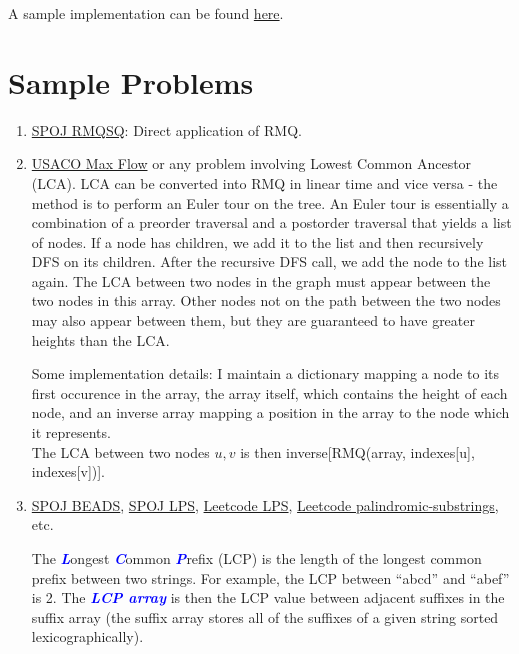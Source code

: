 \documentclass[11pt, oneside]{article}
\newcommand{\emphasis}[1]{\textcolor{blue}{\textbf{\textit{#1}}}}
\begin{document}
A sample implementation can be found \href{https://gist.github.com/stephen-huan/aa609965c86d750736398c28b025f9be#range-minimum-query}{here}.

\section{Sample Problems}

\begin{enumerate}
  \item \href{https://www.spoj.com/problems/RMQSQ/}{SPOJ RMQSQ}: Direct application of RMQ.

  \item \href{http://www.usaco.org/index.php?page=viewproblem2&cpid=576}{USACO Max Flow}
  or any problem involving Lowest Common Ancestor (LCA).
  LCA can be converted into RMQ in linear time and vice versa - the method is to
  perform an Euler tour on the tree. An Euler tour is essentially a combination of a
  preorder traversal and a postorder traversal that yields a list of nodes.
  If a node has children, we add it to the list and then recursively
  DFS on its children. After the recursive DFS call, we add the node to the list again.
  The LCA between two nodes in the graph must appear between the two nodes in this array.
  Other nodes not on the path between the two nodes may also appear between them,
  but they are guaranteed to have greater heights than the LCA.

  Some implementation details: I maintain a dictionary mapping a node to its first
  occurence in the array, the array itself, which contains the height of each node,
  and an inverse array mapping a position in the array to the node which it represents. \\
  The LCA between two nodes \( u, v \) is then inverse[RMQ(array, indexes[u], indexes[v])].

  \item \href{https://www.spoj.com/problems/BEADS/}{SPOJ BEADS}, \href{https://www.spoj.com/problems/LPS/}{SPOJ LPS},
  \href{https://leetcode.com/problems/longest-palindromic-substring/}{Leetcode LPS}, \href{https://leetcode.com/problems/palindromic-substrings/}{Leetcode palindromic-substrings}, etc.

  The \emphasis{L}ongest \emphasis{C}ommon \emphasis{P}refix (LCP) is
  the length of the longest common prefix between two strings.
  For example, the LCP between ``abcd'' and ``abef'' is 2.
  The \emphasis{LCP array} is then the LCP value between adjacent suffixes in the suffix array
  (the suffix array stores all of the suffixes of a given string sorted lexicographically).


\end{enumerate}
\end{document}
